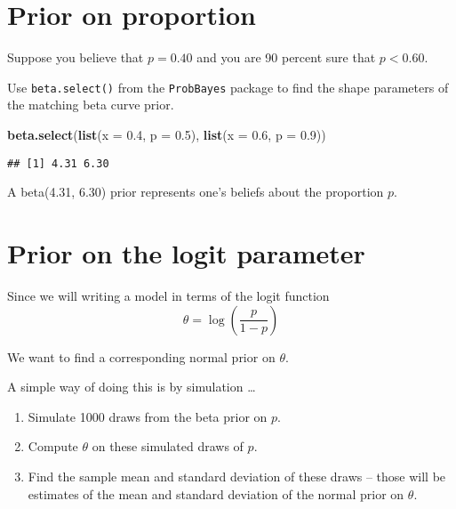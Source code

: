 \documentclass[
]{book}
\newenvironment{Shaded}{\begin{snugshade}}{\end{snugshade}}
\newcommand{\DataTypeTok}[1]{\textcolor[rgb]{0.13,0.29,0.53}{#1}}
\newcommand{\FloatTok}[1]{\textcolor[rgb]{0.00,0.00,0.81}{#1}}
\newcommand{\KeywordTok}[1]{\textcolor[rgb]{0.13,0.29,0.53}{\textbf{#1}}}
\newcommand{\NormalTok}[1]{#1}
\providecommand{\tightlist}{%
  \setlength{\itemsep}{0pt}\setlength{\parskip}{0pt}}
\begin{document}
\hypertarget{prior-on-proportion}{%
\section{Prior on proportion}\label{prior-on-proportion}}

Suppose you believe that \(p = 0.40\) and you are 90 percent sure that \(p < 0.60\).

Use \texttt{beta.select()} from the \texttt{ProbBayes} package to find the shape parameters of the matching beta curve prior.

\begin{Shaded}
\begin{Highlighting}[]
\KeywordTok{beta.select}\NormalTok{(}\KeywordTok{list}\NormalTok{(}\DataTypeTok{x =} \FloatTok{0.4}\NormalTok{, }\DataTypeTok{p =} \FloatTok{0.5}\NormalTok{),}
            \KeywordTok{list}\NormalTok{(}\DataTypeTok{x =} \FloatTok{0.6}\NormalTok{, }\DataTypeTok{p =} \FloatTok{0.9}\NormalTok{))}
\end{Highlighting}
\end{Shaded}

\begin{verbatim}
## [1] 4.31 6.30
\end{verbatim}

A beta(4.31, 6.30) prior represents one's beliefs about the proportion \(p\).

\hypertarget{prior-on-the-logit-parameter}{%
\section{Prior on the logit parameter}\label{prior-on-the-logit-parameter}}

Since we will writing a model in terms of the logit function
\[
\theta = \log \left(\frac{p}{1-p}\right)
\]

We want to find a corresponding normal prior on \(\theta\).

A simple way of doing this is by simulation \ldots{}

\begin{enumerate}
\def\labelenumi{\arabic{enumi}.}
\tightlist
\item
  Simulate 1000 draws from the beta prior on \(p\).
\item
  Compute \(\theta\) on these simulated draws of \(p\).
\item
  Find the sample mean and standard deviation of these draws -- those will be estimates of the mean and standard deviation of the normal prior on \(\theta\).
\end{enumerate}
\end{document}
